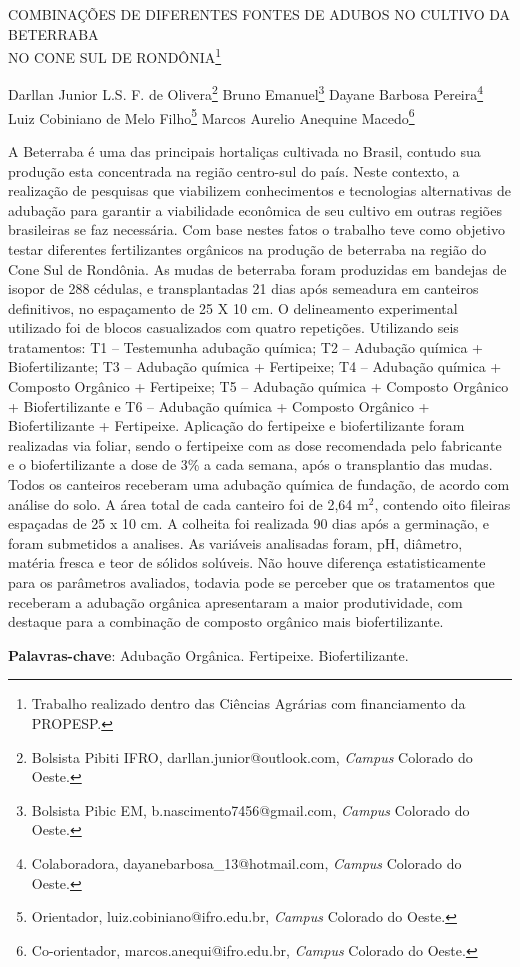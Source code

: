\documentclass[article,12pt,onesidea,4paper,english,brazil]{abntex2}
\begin{document}
	
	
	\frenchspacing 
	
	\begin{center}
		\LARGE COMBINAÇÕES DE DIFERENTES FONTES DE ADUBOS NO CULTIVO DA
		BETERRABA\\NO CONE SUL DE RONDÔNIA\footnote{Trabalho realizado dentro das Ciências Agrárias com financiamento da PROPESP.}
		
		\normalsize
		Darllan Junior L.S. F. de Olivera\footnote{Bolsista Pibiti IFRO, darllan.junior@outlook.com, \textit{Campus} Colorado do Oeste.} 
		Bruno Emanuel\footnote{Bolsista Pibic EM, b.nascimento7456@gmail.com, \textit{Campus} Colorado do Oeste.} 
		Dayane Barbosa Pereira\footnote{Colaboradora, dayanebarbosa\_13@hotmail.com, \textit{Campus} Colorado do Oeste.} \\
		Luiz Cobiniano de Melo Filho\footnote{Orientador, luiz.cobiniano@ifro.edu.br, \textit{Campus} Colorado do Oeste.}
		Marcos Aurelio Anequine Macedo\footnote{Co-orientador, marcos.anequi@ifro.edu.br, \textit{Campus} Colorado do Oeste.} 
	\end{center}
	
	\noindent A Beterraba é uma das principais hortaliças cultivada no Brasil, contudo sua
	produção esta concentrada na região centro-sul do país. Neste contexto, a
	realização de pesquisas que viabilizem conhecimentos e tecnologias alternativas de
	adubação para garantir a viabilidade econômica de seu cultivo em outras regiões
	brasileiras se faz necessária. Com base nestes fatos o trabalho teve como objetivo
	testar diferentes fertilizantes orgânicos na produção de beterraba na região do Cone
	Sul de Rondônia. As mudas de beterraba foram produzidas em bandejas de isopor
	de 288 cédulas, e transplantadas 21 dias após semeadura em canteiros definitivos,
	no espaçamento de 25 X 10 cm. O delineamento experimental utilizado foi de blocos
	casualizados com quatro repetições. Utilizando seis tratamentos: T1 – Testemunha
	adubação química; T2 – Adubação química + Biofertilizante; T3 – Adubação química
	+ Fertipeixe; T4 – Adubação química + Composto Orgânico + Fertipeixe; T5 –
	Adubação química + Composto Orgânico + Biofertilizante e T6 – Adubação química +
	Composto Orgânico + Biofertilizante + Fertipeixe. Aplicação do fertipeixe e
	biofertilizante foram realizadas via foliar, sendo o fertipeixe com as dose
	recomendada pelo fabricante e o biofertilizante a dose de 3\% a cada semana, após
	o transplantio das mudas. Todos os canteiros receberam uma adubação química de
	fundação, de acordo com análise do solo. A área total de cada canteiro foi de 2,64
	m$^2$, contendo oito fileiras espaçadas de 25 x 10 cm. A colheita foi realizada 90 dias
	após a germinação, e foram submetidos a analises. As variáveis analisadas foram,
	pH, diâmetro, matéria fresca e teor de sólidos solúveis. Não houve diferença
	estatisticamente para os parâmetros avaliados, todavia pode se perceber que os
	tratamentos que receberam a adubação orgânica apresentaram a maior
	produtividade, com destaque para a combinação de composto orgânico mais
	biofertilizante.
	
	\vspace{\onelineskip}
	
	\noindent
	\textbf{Palavras-chave}: Adubação Orgânica. Fertipeixe. Biofertilizante.
	
\end{document}
